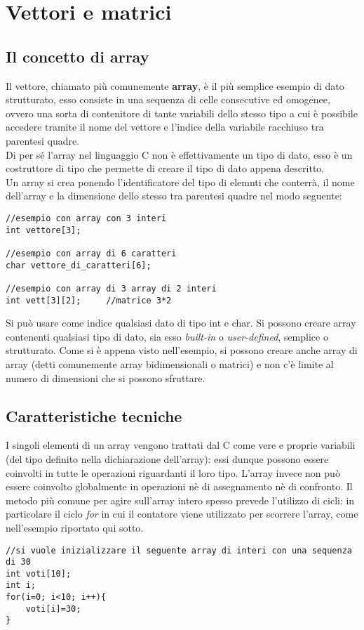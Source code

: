 \chapter{Vettori e matrici}\label{vettori}
\section{Il concetto di array}
Il vettore, chiamato più comunemente \textbf{array}, è il più semplice esempio di dato strutturato, esso consiste in una sequenza di celle consecutive ed omogenee, ovvero una sorta di contenitore di tante variabili dello stesso tipo a cui è possibile accedere tramite il nome del vettore e l’indice della variabile racchiuso tra parentesi quadre.\\
Di per sé l'array nel linguaggio C non è effettivamente un tipo di dato, esso è un costruttore di tipo che permette di creare il tipo di dato appena descritto. \\
Un array si crea ponendo l'identificatore del tipo di elemnti che conterrà, il nome dell'array e la dimensione dello stesso tra parentesi quadre nel modo seguente:
\begin{lstlisting}[title={Implementazione di un array}]
//esempio con array con 3 interi
int vettore[3];

//esempio con array di 6 caratteri
char vettore_di_caratteri[6];

//esempio con array di 3 array di 2 interi
int vett[3][2];		//matrice 3*2
\end{lstlisting}
Si può usare come indice qualsiasi dato di tipo int e char.
Si possono creare array contenenti qualsiasi tipo di dato, sia esso \textit{built-in} o \textit{user-defined}, semplice o strutturato. Come si è appena visto nell'esempio, si possono creare anche array di array (detti comunemente array bidimensionali o matrici) e non c'è limite al numero di dimensioni che si possono sfruttare.

\section{Caratteristiche tecniche}
I singoli elementi di un array vengono trattati dal C come vere e proprie variabili (del tipo definito nella dichiarazione dell'array): essi dunque possono essere coinvolti in tutte le operazioni riguardanti il loro tipo. L'array invece non può essere coinvolto globalmente in operazioni nè di assegnamento nè di confronto. Il metodo più comune per agire sull'array intero spesso prevede l'utilizzo di cicli: in particolare il ciclo \textit{for} in cui il contatore viene utilizzato per scorrere l'array, come nell'esempio riportato qui sotto.
\begin{lstlisting}[title={Implementazione di un array}]
//si vuole inizializzare il seguente array di interi con una sequenza di 30
int voti[10];
int i;
for(i=0; i<10; i++){
    voti[i]=30;
}
\end{lstlisting}

